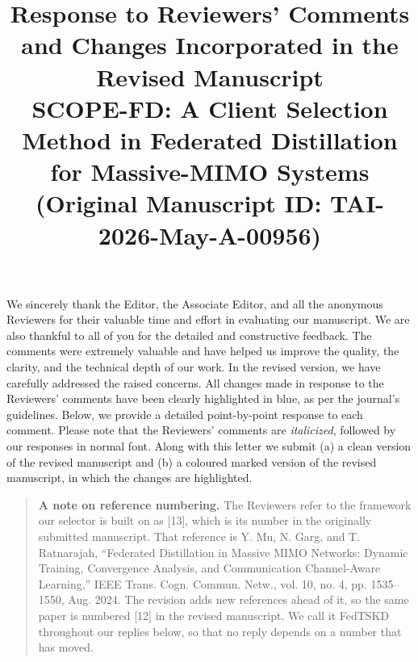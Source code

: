\documentclass[10pt]{article}
\newcommand{\paperTitle}{SCOPE-FD: A Client Selection Method in Federated Distillation for Massive-MIMO Systems}
\begin{document}
\title{
\small Response to Reviewers' Comments and Changes Incorporated in the Revised Manuscript \\
\vspace{1em}
{\Large \bf \paperTitle} \\
(\textbf{Original Manuscript ID: TAI-2026-May-A-00956})
}
\date{}
\maketitle

\vspace{-3em}

We sincerely thank the Editor, the Associate Editor, and all the anonymous Reviewers for their valuable time and effort in evaluating our manuscript. We are also thankful to all of you for the detailed and constructive feedback. The comments were extremely valuable and have helped us improve the quality, the clarity, and the technical depth of our work. In the revised version, we have carefully addressed the raised concerns. {\color{blue}All changes made in response to the Reviewers' comments have been clearly highlighted in blue, as per the journal's guidelines}. Below, we provide a detailed point-by-point response to each comment. Please note that the Reviewers' comments are \textit{italicized}, followed by our responses in normal font. Along with this letter we submit (a) a clean version of the revised manuscript and (b) a coloured marked version of the revised manuscript, in which the changes are highlighted.\\

\begin{quote}
\noindent
\textbf{A note on reference numbering.} The Reviewers refer to the framework our
selector is built on as [13], which is its number in the originally submitted
manuscript. That reference is Y. Mu, N. Garg, and T. Ratnarajah, ``Federated
Distillation in Massive MIMO Networks: Dynamic Training, Convergence Analysis,
and Communication Channel-Aware Learning,'' IEEE Trans. Cogn. Commun.
Netw., vol. 10, no. 4, pp. 1535--1550, Aug. 2024. The revision adds new
references ahead of it, so the same paper is numbered [12] in the revised
manuscript. We call it FedTSKD throughout our replies below, so that no reply
depends on a number that has moved.
\end{quote}

\end{document}
